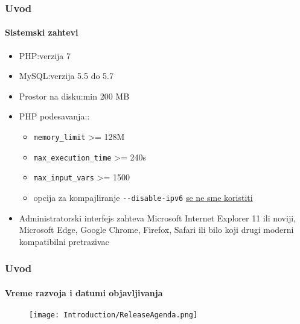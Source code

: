 \begin{frame}[fragile]
	\frametitle{Uvod}
	\framesubtitle{Sistemski zahtevi}

	\begin{itemize}
		\item PHP:\tabto{2.2cm}verzija 7
		\item MySQL:\tabto{2.2cm}verzija  5.5 do 5.7
		\item Prostor na disku:\tabto{2.2cm}min 200 MB
		\item PHP podesavanja::

			\begin{itemize}
				\item \texttt{memory\_limit} >= 128M
				\item \texttt{max\_execution\_time} >= 240s
				\item \texttt{max\_input\_vars} >= 1500
				\item opcija za kompajliranje \texttt{-}\texttt{-disable-ipv6} \underline{se ne sme koristiti} 
			\end{itemize}

		\item Administratorski interfejs zahteva Microsoft Internet Explorer 11 ili noviji, 
			Microsoft Edge, Google Chrome, Firefox, Safari 
			ili bilo koji drugi moderni kompatibilni pretrazivac

	\end{itemize}

\end{frame}

\begin{frame}[fragile]
	\frametitle{Uvod}
	\framesubtitle{Vreme razvoja i datumi objavljivanja}

	\begin{figure}
		\texttt{[image: Introduction/ReleaseAgenda.png]}
	\end{figure}

\end{frame}

